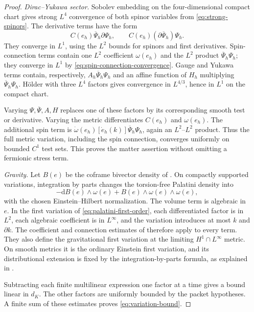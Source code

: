 \documentclass[11pt]{article}
\numberwithin{equation}{section}
\theoremstyle{definition}
\theoremstyle{remark}
\newcommand{\dd}{\mathrm d}
\newcommand{\bPsi}{\overline\Psi}
\begin{document}
\begin{proof}
\emph{Dirac--Yukawa sector.} Sobolev embedding on the four-dimensional compact chart gives strong $L^4$ convergence of both spinor variables from \eqref{eq:strong-spinors}. The derivative terms have the form
\[
 C(e_h)\bPsi_h\partial\Psi_h,
 \qquad C(e_h)(\partial\bPsi_h)\Psi_h.
\]
They converge in $L^1$, using the $L^2$ bounds for spinors and first derivatives. Spin-connection terms contain one $L^2$ coefficient $\omega(e_h)$ and the $L^2$ product $\bPsi_h\Psi_h$; they converge in $L^1$ by \eqref{eq:spin-connection-convergence}. Gauge and Yukawa terms contain, respectively, $A_h\bPsi_h\Psi_h$ and an affine function of $H_h$ multiplying $\bPsi_h\Psi_h$. H\"older with three $L^4$ factors gives convergence in $L^{4/3}$, hence in $L^1$ on the compact chart.

Varying $\Psi,\bPsi,A,H$ replaces one of these factors by its corresponding smooth test or derivative. Varying the metric differentiates $C(e_h)$ and $\omega(e_h)$. The additional spin term is $\dot\omega(e_h)[\dot e_h(k)]\bPsi_h\Psi_h$, again an $L^2$--$L^2$ product. Thus the full metric variation, including the spin connection, converges uniformly on bounded $C^1$ test sets. This proves the matter assertion without omitting a fermionic stress term.

\emph{Gravity.} Let $B(e)$ be the coframe bivector density of . On compactly supported variations, integration by parts changes the torsion-free Palatini density into
\begin{equation}
 -\dd B(e)\wedge\omega(e)+B(e)\wedge\omega(e)\wedge\omega(e),
 \label{eq:palatini-first-order}
\end{equation}
with the chosen Einstein--Hilbert normalization. The volume term is algebraic in $e$. In the first variation of \eqref{eq:palatini-first-order}, each differentiated factor is in $L^2$, each algebraic coefficient is in $L^\infty$, and the variation introduces at most $k$ and $\partial k$. The coefficient and connection estimates of  therefore apply to every term. They also define the gravitational first variation at the limiting $H^1\cap L^\infty$ metric. On smooth metrics it is the ordinary Einstein first variation, and its distributional extension is fixed by the integration-by-parts formula, as explained in .

Subtracting each finite multilinear expression one factor at a time gives a bound linear in $d_K$. The other factors are uniformly bounded by the packet hypotheses. A finite sum of these estimates proves \eqref{eq:variation-bound}.
\end{proof}
\end{document}

